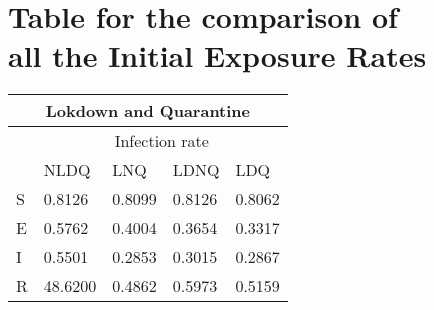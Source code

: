 \chapter{Table for the comparison of\\ all the Initial Exposure Rates }

\begin{center}
\begin{tabularx}{\textwidth}{|X|X|X|X|X|}
	\hline
	\multicolumn{5}{|c|}{Lokdown and Quarantine} \\
	\hline
	& \multicolumn{4}{c|}{Infection rate} \\
	\hline
	& NLDQ & LNQ & LDNQ & LDQ \\
	\hline
	S & 0.8126 & 0.8099 & 0.8126 & 0.8062 \\
	\hline
	E & 0.5762 & 0.4004 & 0.3654 & 0.3317 \\
	\hline
	I & 0.5501 & 0.2853 & 0.3015 & 0.2867 \\
	\hline
	R & 48.6200 & 0.4862 & 0.5973 & 0.5159 \\
	\hline
\end{tabularx}
\end{center}